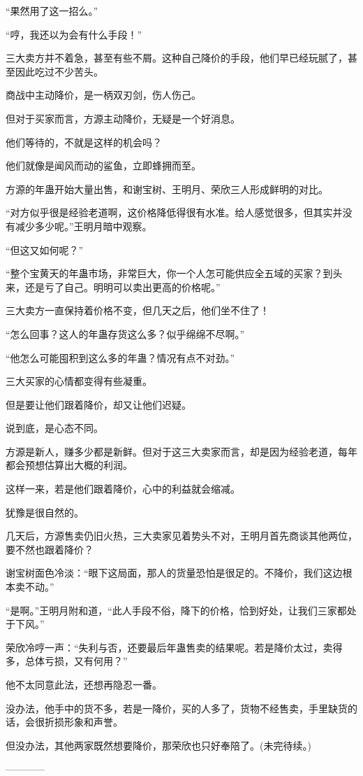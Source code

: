 \begin{this_body}
“果然用了这一招么。”

“哼，我还以为会有什么手段！”

三大卖方并不着急，甚至有些不屑。这种自己降价的手段，他们早已经玩腻了，甚至因此吃过不少苦头。

商战中主动降价，是一柄双刃剑，伤人伤己。

但对于买家而言，方源主动降价，无疑是一个好消息。

他们等待的，不就是这样的机会吗？

他们就像是闻风而动的鲨鱼，立即蜂拥而至。

方源的年蛊开始大量出售，和谢宝树、王明月、荣欣三人形成鲜明的对比。

“对方似乎很是经验老道啊，这价格降低得很有水准。给人感觉很多，但其实并没有减少多少呢。”王明月暗中观察。

“但这又如何呢？”

“整个宝黄天的年蛊市场，非常巨大，你一个人怎可能供应全五域的买家？到头来，还是亏了自己。明明可以卖出更高的价格呢。”

三大卖方一直保持着价格不变，但几天之后，他们坐不住了！

“怎么回事？这人的年蛊存货这么多？似乎绵绵不尽啊。”

“他怎么可能囤积到这么多的年蛊？情况有点不对劲。”

三大买家的心情都变得有些凝重。

但是要让他们跟着降价，却又让他们迟疑。

说到底，是心态不同。

方源是新人，赚多少都是新鲜。但对于这三大卖家而言，却是因为经验老道，每年都会预想估算出大概的利润。

这样一来，若是他们跟着降价，心中的利益就会缩减。

犹豫是很自然的。

几天后，方源售卖仍旧火热，三大卖家见着势头不对，王明月首先商谈其他两位，要不然也跟着降价？

谢宝树面色冷淡：“眼下这局面，那人的货量恐怕是很足的。不降价，我们这边根本卖不动。”

“是啊。”王明月附和道，“此人手段不俗，降下的价格，恰到好处，让我们三家都处于下风。”

荣欣冷哼一声：“失利与否，还要最后年蛊售卖的结果呢。若是降价太过，卖得多，总体亏损，又有何用？”

他不太同意此法，还想再隐忍一番。

没办法，他手中的货不多，若是一降价，买的人多了，货物不经售卖，手里缺货的话，会很折损形象和声誉。

但没办法，其他两家既然想要降价，那荣欣也只好奉陪了。(未完待续。)

------------

\end{this_body}

